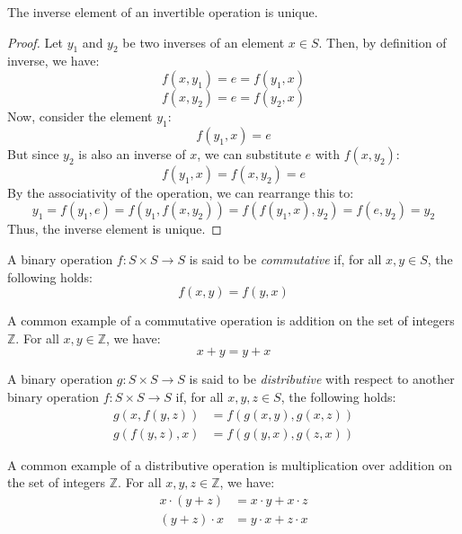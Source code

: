 \documentclass[
	11pt, %
	fleqn, %
	a4paper, %
]{LegrandOrangeBook}
\begin{document}
\newpage

\begin{proposition}
    The inverse element of an invertible operation is unique.
\end{proposition}

\begin{proof}
    Let $y_1$ and $y_2$ be two inverses of an element $x \in S$. Then, by definition of inverse, we have:
    \[ f(x,y_1) = e = f(y_1,x) \]
    \[ f(x,y_2) = e = f(y_2,x) \]
    Now, consider the element $y_1$:
    \[ f(y_1,x) = e \]
    But since $y_2$ is also an inverse of $x$, we can substitute $e$ with $f(x,y_2)$:
    \[ f(y_1,x) = f(x,y_2) = e \]
    By the associativity of the operation, we can rearrange this to:
    \[ y_1 = f(y_1, e) = f(y_1,f(x,y_2)) = f(f(y_1,x),y_2) = f(e,y_2) = y_2 \]
    Thus, the inverse element is unique.
\end{proof}

\begin{definition}
    A binary operation $f: S \times S \to S$ is said to be \emph{commutative} if, for all $x,y \in S$, the following holds:
    \[ f(x,y) = f(y,x) \]
\end{definition}

\begin{example}
    A common example of a commutative operation is addition on the set of integers $\mathbb{Z}$. For all $x,y \in \mathbb{Z}$, we have:
    \[ x + y = y + x \]
\end{example}

\begin{definition}
    A binary operation $g: S \times S \to S$ is said to be \emph{distributive} with respect to another binary operation $f: S \times S \to S$ if, for all $x,y,z \in S$, the following holds:
    \[ \begin{split}
        g(x,f(y,z)) &= f(g(x,y),g(x,z)) \\
        g(f(y,z),x) &= f(g(y,x),g(z,x))
    \end{split} \]
\end{definition}

\begin{example}
    A common example of a distributive operation is multiplication over addition on the set of integers $\mathbb{Z}$. For all $x,y,z \in \mathbb{Z}$, we have:
    \[ \begin{split}
        x \cdot (y + z) &= x \cdot y + x \cdot z \\
        (y + z) \cdot x &= y \cdot x + z \cdot x
    \end{split} \]
\end{example}
\end{document}
